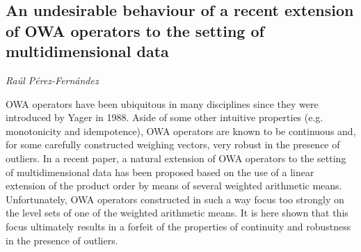 \documentclass[../booklet.tex]{subfiles}
\begin{document}
\subsection[An undesirable behaviour of a recent extension of OWA operators to the setting of multidimensional data. {\it Raúl Pérez-Fernández}]{An undesirable behaviour of a recent extension of OWA operators to the setting of multidimensional data}

\begin{center}
  {\it Raúl Pérez-Fernández}
\end{center}

\vskip 0.8cm


OWA operators have been ubiquitous in many disciplines since they were introduced by Yager in 1988. Aside of some other intuitive properties (e.g. monotonicity and idempotence), OWA operators are known to be continuous and, for some carefully constructed weighing vectors, very robust in the presence of outliers. In a recent paper, a natural extension of OWA operators to the setting of multidimensional data has been proposed based on the use of a linear extension of the product order by means of several weighted arithmetic means. Unfortunately, OWA operators constructed in such a way focus too strongly on the level sets of one of the weighted arithmetic means. It is here shown that this focus ultimately results in a forfeit of the properties of continuity and robustness in the presence of outliers. 

\end{document}
